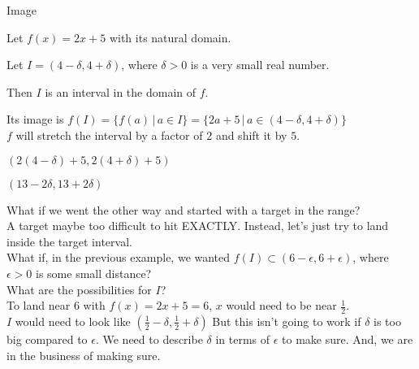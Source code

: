 \documentclass{ximera}
\begin{document}
\begin{example} Image

Let $f(x) = 2x + 5$ with its natural domain.

Let  $I = (4-\delta, 4+\delta)$, where $\delta > 0$ is a very small real number.

Then $I$ is an interval in the domain of $f$.


Its image is $f(I) = \{   f(a)  \, | \, a \in I \}  = \{   2a+5  \, | \, a \in (4-\delta, 4+\delta) \}$  \\



$f$ will stretch the interval by a factor of $2$ and shift it by $5$.


$(2(4-\delta)+5, 2(4+\delta)+5)$


$(13-2\delta, 13+2\delta)$






\end{example}













What if we went the other way and started with a target in the range? \\

A target maybe too difficult to hit EXACTLY.  Instead, let's just try to land inside the target interval. \\



What if, in the previous example, we wanted $f(I) \subset (6-\epsilon, 6+\epsilon)$, where $\epsilon > 0$ is some small distance?  \\


What are the possibilities for $I$?  \\







To land near $6$ with $f(x) = 2x + 5 = 6$, $x$ would need to be near $\frac{1}{2}$.  \\

$I$ would need to look like $\left( \frac{1}{2} - \delta, \frac{1}{2}+ \delta \right)$  But this isn't going to work if $\delta$ is too big compared to $\epsilon$.  We need to describe $\delta$ in terms of $\epsilon$ to make sure.  And, we are in the business of making sure. \\
\end{document}
